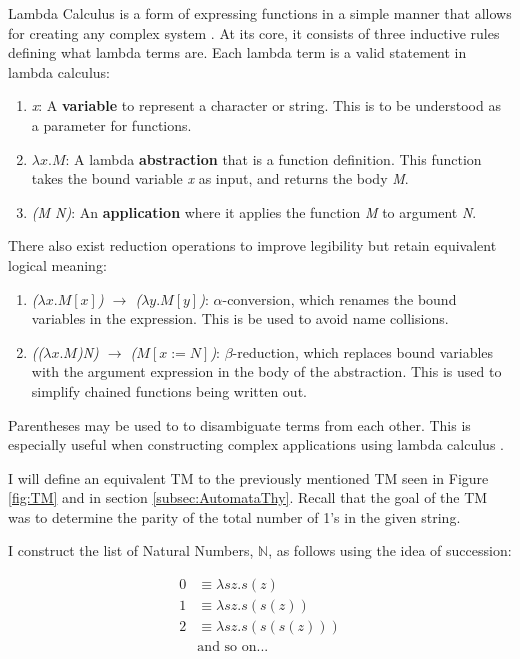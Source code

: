 Lambda Calculus is a form of expressing functions in a simple manner that allows for creating any complex system \cite{LambdaCalcRG}.
At its core, it consists of three inductive rules defining what lambda terms are.
Each lambda term is a valid statement in lambda calculus:
\begin{enumerate}
    \item \textit{x}: A \textbf{variable} to represent a character or string.
    This is to be understood as a parameter for functions.
    \item \textit{$\lambda x.M$}: A lambda \textbf{abstraction} that is a function definition.
    This function takes the bound variable \textit{x} as input, and returns the body \textit{M}.
    \item \textit{(M N)}: An \textbf{application} where it applies the function \textit{M} to argument \textit{N}.
\end{enumerate}

There also exist reduction operations to improve legibility but retain equivalent logical meaning:

\begin{enumerate}
    \item \textit{($\lambda x.M[x]$) $\rightarrow$ ($\lambda y.M[y]$)}: $\alpha$-conversion, which renames the bound variables in the expression.
    This is be used to avoid name collisions.
    \item \textit{(($\lambda x.M$)\textit{N}) $\rightarrow$ ($M[x:=N]$)}: $\beta$-reduction, which replaces bound variables with the argument expression in the body of the abstraction.
    This is used to simplify chained functions being written out.
\end{enumerate}

Parentheses may be used to to disambiguate terms from each other.
This is especially useful when constructing complex applications using lambda calculus \cite{LambdaCalcWiki}.

I will define an equivalent TM to the previously mentioned TM seen in Figure \ref{fig:TM} and in section \ref{subsec:AutomataThy}.
Recall that the goal of the TM was to determine the parity of the total number of 1's in the given string.

I construct the list of Natural Numbers, $\mathbb{N}$, as follows using the idea of succession:

\[
    \begin{aligned}
        0 &\equiv \lambda sz.s(z)\\
        1 &\equiv \lambda sz.s(s(z))\\
        2 &\equiv \lambda sz.s(s(s(z)))\\
        &\text{and so on...}\\
    \end{aligned}
\]

